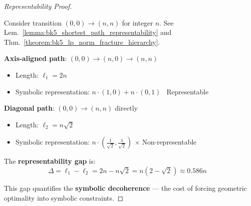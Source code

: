 \begin{proof}[Representability Proof]
\label{proof:bk5_shortest_path_representability}
\leavevmode

Consider transition $(0,0) \to (n,n)$ for integer $n$.
See Lem.~\ref{lemma:bk5_shortest_path_representability} and Thm.~\ref{theorem:bk5_lp_norm_fracture_hierarchy}.

\textbf{Axis-aligned path}: $(0,0) \to (n,0) \to (n,n)$
\begin{itemize}
  \item Length: $\ell_1 = 2n$
  \item Symbolic representation: $n \cdot (1,0) + n \cdot (0,1)$ \quad \checkmark\ Representable
\end{itemize}

\textbf{Diagonal path}: $(0,0) \to (n,n)$ directly
\begin{itemize}
  \item Length: $\ell_2 = n\sqrt{2}$
  \item Symbolic representation: $n \cdot \left(\frac{1}{\sqrt{2}}, \frac{1}{\sqrt{2}}\right)$ \quad $\times$ Non-representable
\end{itemize}

The \textbf{representability gap} is:
\[
\Delta = \ell_1 - \ell_2 = 2n - n\sqrt{2} = n(2 - \sqrt{2}) \approx 0.586n
\]

This gap quantifies the \textbf{symbolic decoherence} — the cost of forcing geometric optimality into symbolic constraints.
\end{proof}

